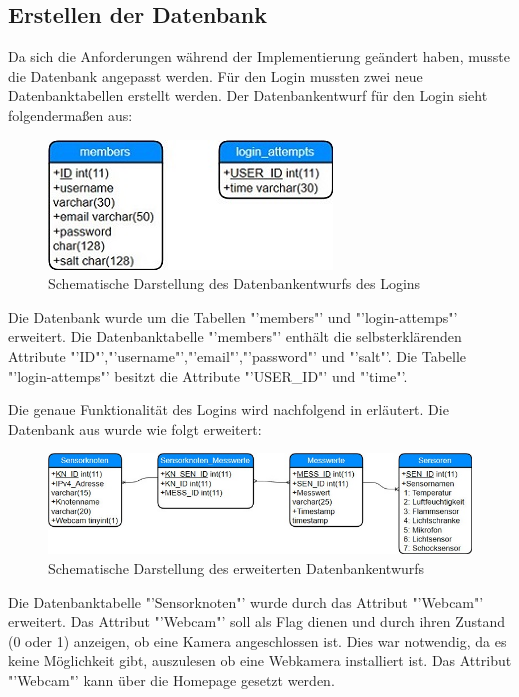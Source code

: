 \subsection{Erstellen der Datenbank}
Da sich die Anforderungen während der Implementierung geändert haben, musste die Datenbank angepasst werden. Für den Login mussten zwei neue Datenbanktabellen erstellt werden. Der Datenbankentwurf für den Login sieht folgendermaßen aus:
\begin{figure}[htp]
	\begin{center}
		\includegraphics{Bilder/Kapitel4/db_login.jpg}
		\caption[Schematische Darstellung des Datenbankentwurfs des Logins]{Schematische Darstellung des Datenbankentwurfs des Logins}
		\label{fig:Datenbankentwurf_login}
	\end{center}
\end{figure}
Die Datenbank wurde um die Tabellen "'members"' und "'login-attemps"' erweitert. Die Datenbanktabelle "'members"' enthält die selbsterklärenden Attribute "'ID"',"'username"',"'email"',"'password"' und "'salt"'. Die Tabelle "'login-attemps"' besitzt die Attribute "'USER\_ID"' und "'time"'. 

Die genaue Funktionalität des Logins wird nachfolgend in  erläutert.
Die Datenbank aus  wurde wie folgt erweitert:
\begin{figure}[htp]
	\includegraphics[width=\textwidth]{Bilder/Kapitel4/Datenbankentwurf2.jpg}
	\caption[Schematische Darstellung des erweiterten Datenbankentwurfs]{Schematische Darstellung des erweiterten Datenbankentwurfs}
	\label{fig:Datenbankentwurf_erweiterung}
\end{figure}
Die Datenbanktabelle "'Sensorknoten"' wurde durch das Attribut "'Webcam"' erweitert. Das Attribut "'Webcam"' soll als Flag dienen und durch ihren Zustand (0 oder 1) anzeigen, ob eine Kamera angeschlossen ist. Dies war notwendig, da es keine Möglichkeit gibt, auszulesen ob eine Webkamera installiert ist. Das Attribut "'Webcam"' kann über die Homepage gesetzt werden.

